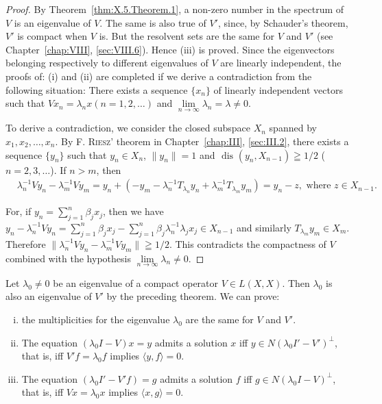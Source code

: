 \begin{proof}
 By Theorem~\ref{thm:X.5.Theorem.1}, a non-zero number in the spectrum of $V$ is an eigenvalue of $V$. The same is also true of $V'$, since, by Schauder's theorem, $V'$ is compact when $V$ is. But the resolvent sets are the same for $V$ and $V'$ (see Chapter~\ref{chap:VIII}, \ref{sec:VIII.6}). Hence (iii) is proved. Since the eigenvectors belonging respectively to different eigenvalues of $V$ are linearly independent, the proofs of:
 (i) and (ii) are completed if we derive a contradiction from the following situation:
There exists a sequence $\{x _{n} \}$ of linearly independent vectors such that $V x _{n} = \lambda_{n} x (n = 1, 2, \dots)$ and $\lim\limits _{n \to \infty} \lambda_{n} = \lambda \neq 0.$


To derive a contradiction, we consider the closed subspace $X_{n}$ spanned by $x_{1}, x_{2}, \ldots, x_{n}$. By F. \textsc{Riesz}' theorem in Chapter~\ref{chap:III}, \ref{sec:III.2}, there exists a sequence $\{y_{n}\}$ such that $y_{n} \in X_{n}$, $\| y_{n} \| = 1$ and $\text{ dis }(y_{n}, X_{n-1}) \geqq 1/2$ ( $n = 2, 3, \ldots$). If $n > m$, then 
\[
\begin{aligned}
&\lambda_{n} ^{-1} V y _{n} - \lambda_{m} ^{-1} V y _{m} = y _{n} + (- y _{m} - \lambda_{n} ^{-1} T _ {\lambda_{n}} y _{n} + \lambda_{m} ^{-1} T _ {\lambda_{m}} y _{m}) = y _{n} - z, \text{ where } z \in X _{n-1}.
\end{aligned}
\]

For, if $y_{n} = \sum\limits_{j=1}^{n} \beta_{j} x_{j}$, then we have $y_{n} - \lambda_{n}^{-1} V y_{n} = \sum\limits_{j=1}^{n} \beta_{j} x_{j} - \sum\limits_{j=1}^{n} \beta_{j} \lambda_{n}^{-1} \lambda_{j} x_{j} \in X_{n-1}$ and similarly $T_{\lambda_m} y_m \in X_m$. Therefore $\|\lambda_n^{-1} V y_n - \lambda_m^{-1} V y_m\| \geqq 1/2$. This contradicts the compactness of $V$ combined with the hypothesis $\lim\limits_{n \to \infty} \lambda_n \neq 0$. 
\end{proof}
\begin{theorem}\label{thm:X.5.Theorem.3} Let $\lambda_0 \neq 0$ be an eigenvalue of a compact operator $V \in L(X, X)$. Then $\lambda_0$ is also an eigenvalue of $V'$ by the preceding theorem. We can prove: \begin{enumerate}[(i)]
\item the multiplicities for the eigenvalue $\lambda_0$ are the same for $V$ and $V'$.
\item The equation $(\lambda_0 I - V)x = y$ admits a solution $x$ iff $y \in N(\lambda_0 I' - V')^\perp$, that is, iff $V'f = \lambda_0 f$ implies $\langle y, f \rangle = 0$.
\item The equation $(\lambda_0 I' - V'f) = g$ admits a solution $f$ iff $g \in N(\lambda_0 I - V)^\perp$, that is, iff $Vx = \lambda_0 x$ implies $\langle x, g \rangle = 0$.
\end{enumerate}
\end{theorem}

